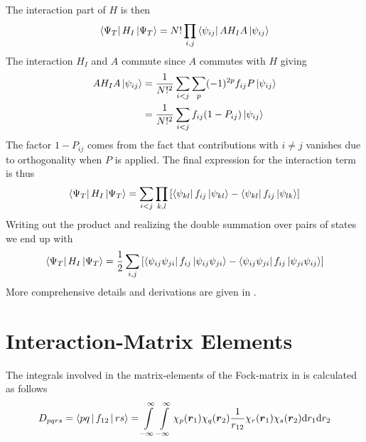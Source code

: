         The interaction part of $H$ is then
            \begin{equation}
                \bra{\Psi_T}H_I\ket{\Psi_T} = N!\prod_{i,j}\bra{\psi_{ij}}AH_IA\ket{\psi_{ij}}
            \end{equation}
        The interaction $H_I$ and $A$ commute since $A$ commutes with $H$
        giving
            \begin{align}
                AH_IA\ket{\psi_{ij}} &= \frac{1}{N!^2}\sum_{i<j}\sum_{p}
                (-1)^{2p}f_{ij} P\ket{\psi_{ij}} \\
                &= \frac{1}{N!^2}\sum_{i<j}f_{ij}(1-P_{ij})\ket{\psi_{ij}}
            \end{align}
        The factor $1-P_{ij}$ comes from the fact that contributions with
        $i\neq j$ vanishes due to orthogonality when $P$ is applied. The final
        expression for the interaction term is thus
            \begin{equation}
                \bra{\Psi_T}H_I\ket{\Psi_T} =
                \sum_{i<j}\prod_{k,l}\left[\bra{\psi_{kl}}f_{ij}\ket{\psi_{kl}} -
                \bra{\psi_{kl}}f_{ij}\ket{\psi_{lk}}\right]
            \end{equation}
        Writing out the product and realizing the double summation over pairs
        of states we end up with
            \begin{equation}
                \bra{\Psi_T}H_I\ket{\Psi_T} = \frac{1}{2}
                \sum_{i,j}\left[\bra{\psi_{ij}\psi_{ji}}f_{ij}\ket{\psi_{ij}\psi_{ji}} -
                \bra{\psi_{ij}\psi_{ji}}f_{ij}\ket{\psi_{ji}\psi_{ij}}\right]
            \end{equation}
        More comprehensive details and derivations are given in
        \cite{compphysThijssen,basicMB}.

\section{Interaction-Matrix Elements}
    The integrals involved in the matrix-elements of the Fock-matrix in
     is calculated as follows
        \begin{align}
            D_{pqrs} = \Braket{pq | f_{12} | rs} = \int\limits^{\infty}_{-\infty}\int\limits^{\infty}_{-\infty}
            \chi_p(\boldsymbol{{r}}_1)\chi_q(\boldsymbol{{r}}_2) \frac{1}{r_{12}}
            \chi_r(\boldsymbol{{r}}_1)\chi_s(\boldsymbol{{r}}_2) \mathrm{d} r_1 \mathrm{d} r_2
        \end{align}

